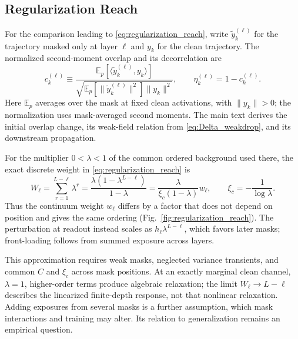 \FloatBarrier

\subsection{Regularization Reach}
\label{app:regularization_reach}

For the comparison leading to \eqref{eq:regularization_reach}, write \(\tilde y_k^{(\ell)}\) for the trajectory masked only at layer \(\ell\) and \(y_k\) for the clean trajectory. The normalized second-moment overlap and its decorrelation are
\begin{equation}
c_k^{(\ell)}
\equiv
\frac{\mathbb E_p[\langle \tilde y_k^{(\ell)},y_k\rangle]}
{\sqrt{\mathbb E_p[\|\tilde y_k^{(\ell)}\|^2]\|y_k\|^2}},
\qquad \eta_k^{(\ell)}=1-c_k^{(\ell)}.
\end{equation}
Here \(\mathbb E_p\) averages over the mask at fixed clean activations, with \(\|y_k\|>0\); the normalization uses mask-averaged second moments. The main text derives the initial overlap change, its weak-field relation from \eqref{eq:Delta_weakdrop}, and its downstream propagation.

For the multiplier \(0<\lambda<1\) of the common ordered background used there, the exact discrete weight in \eqref{eq:regularization_reach} is
\begin{equation}
W_\ell=\sum_{r=1}^{L-\ell}\lambda^r
=\frac{\lambda(1-\lambda^{L-\ell})}{1-\lambda}
=\frac{\lambda}{\xi_c(1-\lambda)}w_\ell,
\qquad \xi_c=-\frac{1}{\log\lambda}.
\end{equation}
Thus the continuum weight \(w_\ell\) differs by a factor that does not depend on position and gives the same ordering (Fig.~\ref{fig:regularization_reach}). The perturbation at readout instead scales as \(h_\ell\lambda^{L-\ell}\), which favors later masks; front-loading follows from summed exposure across layers.

\begin{samepage}
This approximation requires weak masks, neglected variance transients, and common \(C\) and \(\xi_c\) across mask positions. At an exactly marginal clean channel, \(\lambda=1\), higher-order terms produce algebraic relaxation; the limit \(W_\ell\to L-\ell\) describes the linearized finite-depth response, not that nonlinear relaxation. Adding exposures from several masks is a further assumption, which mask interactions and training may alter. Its relation to generalization remains an empirical question.
\end{samepage}

